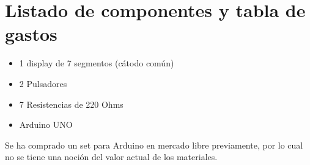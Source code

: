 \section{Listado de componentes y tabla de gastos}
\begin{itemize}
    \item 1 display de 7 segmentos (cátodo común)
    \item 2 Pulsadores
    \item 7 Resistencias de 220 Ohms
    \item Arduino UNO
\end{itemize}

Se ha comprado un set para Arduino en mercado libre previamente, por lo cual no se tiene una noción del valor actual de los materiales.